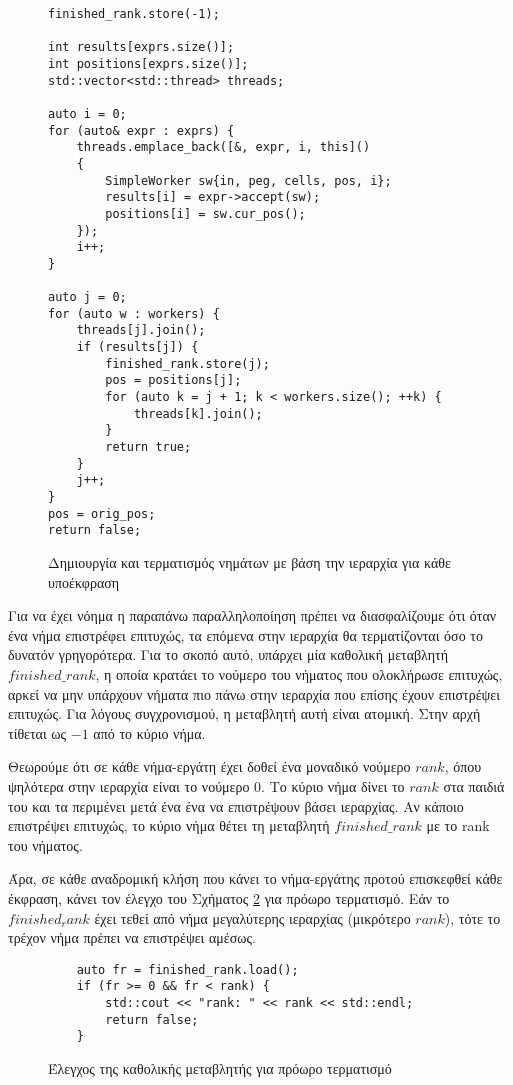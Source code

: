 \begin{figure}[h]
\setlength\partopsep{-\topsep}%
\begin{verbatim}
finished_rank.store(-1);

int results[exprs.size()];
int positions[exprs.size()];
std::vector<std::thread> threads;

auto i = 0;
for (auto& expr : exprs) { 
    threads.emplace_back([&, expr, i, this]()
    {
        SimpleWorker sw{in, peg, cells, pos, i};
        results[i] = expr->accept(sw);
        positions[i] = sw.cur_pos();
    });
    i++;
}

auto j = 0;
for (auto w : workers) {
    threads[j].join(); 
    if (results[j]) { 
        finished_rank.store(j);
        pos = positions[j];
        for (auto k = j + 1; k < workers.size(); ++k) {
            threads[k].join();
        }
        return true;
    }
    j++;
}
pos = orig_pos;
return false;
\end{verbatim}
\caption{Δημιουργία και τερματισμός νημάτων με βάση την ιεραρχία για κάθε υποέκφραση}
\label{fig:top_down_1}
\end{figure}

Για να έχει νόημα η παραπάνω παραλληλοποίηση πρέπει να διασφαλίζουμε ότι όταν ένα νήμα επιστρέφει επιτυχώς, τα επόμενα στην ιεραρχία θα τερματίζονται όσο το δυνατόν γρηγορότερα.
Για το σκοπό αυτό, υπάρχει μία καθολική μεταβλητή $finished\_rank$, η οποία κρατάει το νούμερο του νήματος που ολοκλήρωσε επιτυχώς, αρκεί να μην υπάρχουν νήματα πιο πάνω στην ιεραρχία που επίσης έχουν επιστρέψει επιτυχώς.
Για λόγους συγχρονισμού, η μεταβλητή αυτή είναι ατομική.
Στην αρχή τίθεται ως $-1$ από το κύριο νήμα.

Θεωρούμε ότι σε κάθε νήμα-εργάτη έχει δοθεί ένα μοναδικό νούμερο $rank$, όπου ψηλότερα στην ιεραρχία είναι το νούμερο $0$.
Το κύριο νήμα δίνει το $rank$ στα παιδιά του και τα περιμένει μετά ένα ένα να επιστρέψουν βάσει ιεραρχίας.
Αν κάποιο επιστρέψει επιτυχώς, το κύριο νήμα θέτει τη μεταβλητή $finished\_rank$ με το rank του νήματος.

Άρα, σε κάθε αναδρομική κλήση που κάνει το νήμα-εργάτης προτού επισκεφθεί κάθε έκφραση, κάνει τον έλεγχο του Σχήματος \ref{fig:top_down_2} για πρόωρο τερματισμό.
Εάν το $finished_rank$ έχει τεθεί από νήμα μεγαλύτερης ιεραρχίας (μικρότερο $rank$), τότε το τρέχον νήμα πρέπει να επιστρέψει αμέσως.

\begin{figure}[h]
\setlength\partopsep{-\topsep}%
\begin{verbatim}
    auto fr = finished_rank.load();
    if (fr >= 0 && fr < rank) { 
        std::cout << "rank: " << rank << std::endl;
        return false;
    }
\end{verbatim}
\caption{Έλεγχος της καθολικής μεταβλητής για πρόωρο τερματισμό}
\label{fig:top_down_2}
\end{figure}

